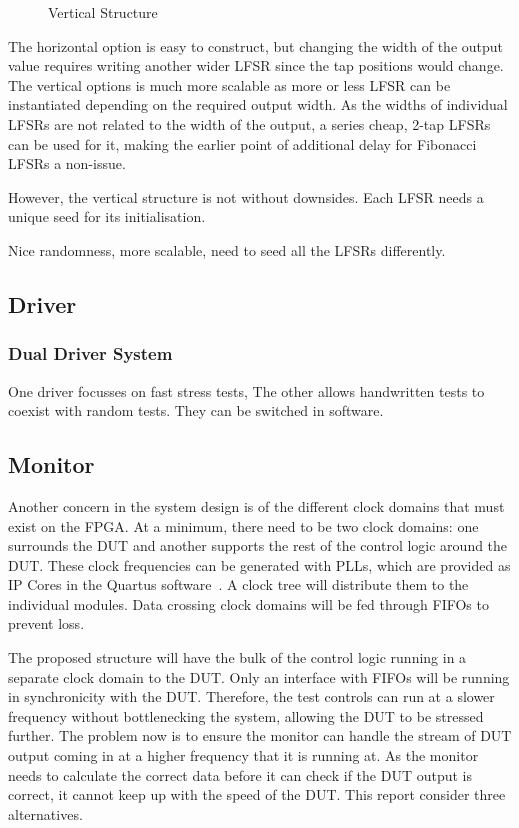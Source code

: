 \begin{figure}[ht]
  \centering
  
  \caption{Vertical Structure}
  \label{VertLFSR}
\end{figure}

The horizontal option is easy to construct, but changing the width of the output value requires writing another wider LFSR since the tap positions would change.
The vertical options is much more scalable as more or less LFSR can be instantiated depending on the required output width.
As the widths of individual LFSRs are not related to the width of the output, a series cheap, 2-tap LFSRs can be used for it, making the earlier point of additional delay for Fibonacci LFSRs a non-issue.

However, the vertical structure is not without downsides.
Each LFSR needs a unique seed for its initialisation.


Nice randomness, more scalable, need to seed all the LFSRs differently.

\subsection{Driver}
\subsubsection{Dual Driver System}
One driver focusses on fast stress tests, The other allows handwritten tests to coexist with random tests.
They can be switched in software.

\subsection{Monitor}

Another concern in the system design is of the different clock domains that must exist on the FPGA.
At a minimum, there need to be two clock domains: one surrounds the DUT and another supports the rest of the control logic around the DUT.
These clock frequencies can be generated with PLLs, which are provided as IP Cores in the Quartus software~\cite{Altera4}.
A clock tree will distribute them to the individual modules.
Data crossing clock domains will be fed through FIFOs to prevent loss.

The proposed structure will have the bulk of the control logic running in a separate clock domain to the DUT.
Only an interface with FIFOs will be running in synchronicity with the DUT.
Therefore, the test controls can run at a slower frequency without bottlenecking the system, allowing the DUT to be stressed further.
The problem now is to ensure the monitor can handle the stream of DUT output coming in at a higher frequency that it is running at.
As the monitor needs to calculate the correct data before it can check if the DUT output is correct, it cannot keep up with the speed of the DUT.
This report consider three alternatives.

